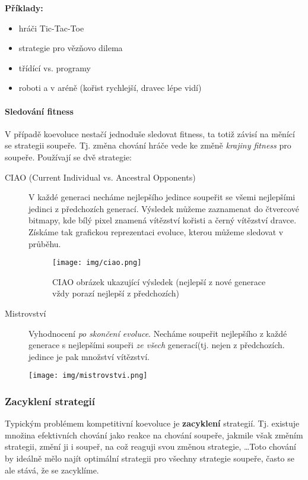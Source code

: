 \textbf{Příklady: }
\begin{itemize}
\item hráči Tic-Tac-Toe
\item strategie pro vězňovo dilema
\item třídící vs.  programy
\item roboti  a  v aréně (kořist rychlejší, dravec lépe vidí)
\end{itemize}

\paragraph{Sledování fitness}
V případě koevoluce nestačí jednoduše sledovat fitness, ta totiž závisí na měnící se strategii soupeře. Tj. změna chování hráče vede ke změně \textit{krajiny fitness} pro soupeře. Používají se dvě strategie:
\begin{description}
\item[CIAO (Current Individual vs. Ancestral Opponents)] V každé generaci necháme nejlepšího jedince soupeřit se všemi nejlepšími jedinci z předchozích generací. Výsledek můžeme zaznamenat do čtvercové bitmapy, kde bílý pixel znamená vítězství kořisti a černý vítězství dravce. Získáme tak grafickou reprezentaci evoluce, kterou můžeme sledovat v průběhu.

\begin{figure}[H]
\centering
\texttt{[image: img/ciao.png]}
\caption{CIAO obrázek ukazující  výsledek (nejlepší z nové generace vždy porazí nejlepší z předchozích)}
\end{figure}

\item[Mistrovství] Vyhodnocení \textit{po skončení evoluce}. Necháme soupeřit nejlepšího z každé generace s nejlepšími soupeři \textit{ze všech} generací(tj. nejen z předchozích.  jedince je pak množství vítězství.
\end{description}

\begin{figure}[H]
\centering
\texttt{[image: img/mistrovstvi.png]}
\end{figure}


\subsubsection{Zacyklení strategií}
Typickým problémem kompetitivní koevoluce je \textbf{zacyklení} strategií. Tj. existuje množina efektivních chování jako reakce na chování soupeře, jakmile však změním strategii, změní ji i soupeř, na což reaguji svou změnou strategie, \dots Toto chování by ideálně mělo najít optimální strategii pro všechny strategie soupeře, často se ale stává, že se zacyklíme. 

